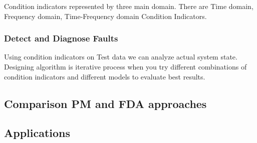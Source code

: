\documentclass[class=article, crop=false]{standalone}
\begin{document}
Condition indicators represented by three main domain. There are Time
domain, Frequency domain, Time-Frequency domain Condition Indicators.

\subsubsection{Detect and Diagnose Faults}
Using condition indicators on Test data we can analyze actual system state.
Designing algorithm is iterative process when you try different
combinations of condition indicators and different models to evaluate best
results.

\subsection{Comparison PM and FDA approaches}

\subsection{Applications}
\end{document}
